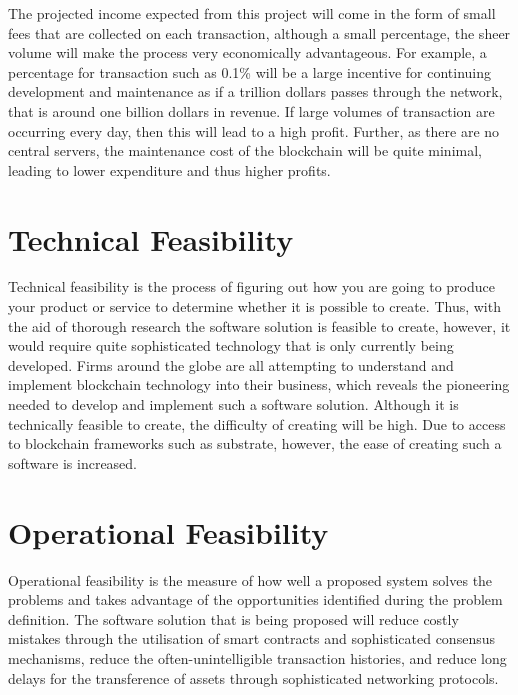 The projected income expected from this project will come in the form of small fees that are collected on each transaction, although a small percentage, the sheer volume will make the process very economically advantageous. For example, a percentage for transaction such as 0.1\% will be a large incentive for continuing development and maintenance as if a trillion dollars passes through the network, that is around one billion dollars in revenue. If large volumes of transaction are occurring every day, then this will lead to a high profit. Further, as there are no central servers, the maintenance cost of the blockchain will be quite minimal, leading to lower expenditure and thus higher profits.

\section{Technical Feasibility}

Technical feasibility is the process of figuring out how you are going to produce your product or service to determine whether it is possible to create. Thus, with the aid of thorough research the software solution is feasible to create, however, it would require quite sophisticated technology that is only currently being developed. Firms around the globe are all attempting to understand and implement blockchain technology into their business, which reveals the pioneering needed to develop and implement such a software solution. Although it is technically feasible to create, the difficulty of creating will be high. Due to access to blockchain frameworks such as substrate, however, the ease of creating such a software is increased.\\

\section{Operational Feasibility}

Operational feasibility is the measure of how well a proposed system solves the problems and takes advantage of the opportunities identified during the problem definition. The software solution that is being proposed will reduce costly mistakes through the utilisation of smart contracts and sophisticated consensus mechanisms, reduce the often-unintelligible transaction histories, and reduce long delays for the transference of assets through sophisticated networking protocols. \\

